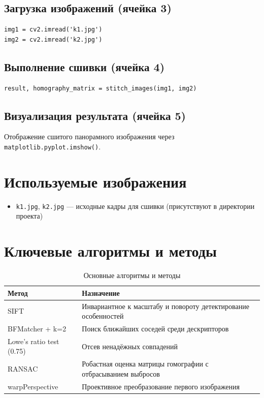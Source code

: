 \documentclass[a4paper,14pt]{extarticle}
\begin{document}
\subsection{Загрузка изображений (ячейка 3)}
\begin{lstlisting}
img1 = cv2.imread('k1.jpg')
img2 = cv2.imread('k2.jpg')
\end{lstlisting}

\subsection{Выполнение сшивки (ячейка 4)}
\begin{lstlisting}
result, homography_matrix = stitch_images(img1, img2)
\end{lstlisting}

\subsection{Визуализация результата (ячейка 5)}
Отображение сшитого панорамного изображения через \texttt{matplotlib.pyplot.imshow()}.

\section{Используемые изображения}
\begin{itemize}
\item \texttt{k1.jpg}, \texttt{k2.jpg} — исходные кадры для сшивки (присутствуют в директории проекта)
\end{itemize}

\section{Ключевые алгоритмы и методы}

\begin{table}[h]
\centering
\renewcommand{\arraystretch}{1.3}
\begin{tabularx}{\textwidth}{|l|X|}
\hline
\textbf{Метод} & \textbf{Назначение} \\
\hline
SIFT & Инвариантное к масштабу и повороту детектирование особенностей \\
\hline
BFMatcher + k=2 & Поиск ближайших соседей среди дескрипторов \\
\hline
Lowe's ratio test (0.75) & Отсев ненадёжных совпадений \\
\hline
RANSAC & Робастная оценка матрицы гомографии с отбрасыванием выбросов \\
\hline
warpPerspective & Проективное преобразование первого изображения \\
\hline
\end{tabularx}
\caption{Основные алгоритмы и методы}
\end{table}
\end{document}
